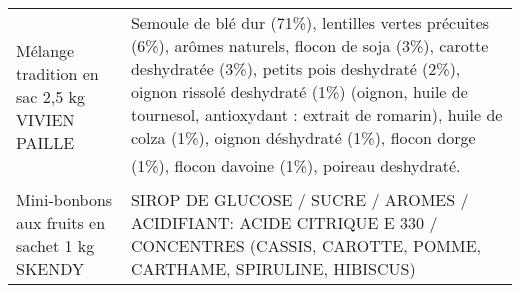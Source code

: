 \begin{longtable}{p{5cm}p{10cm}}
                                                            Mélange tradition en sac 2,5 kg VIVIEN PAILLE &                                                                                                                                                                                                                                                                                                                                                                                                                                                                                                                                                                                                                                                                        Semoule de blé dur (71\%), lentilles vertes précuites (6\%), arômes naturels, flocon de soja (3\%), carotte deshydratée (3\%), petits pois deshydraté (2\%), oignon rissolé deshydraté (1\%) (oignon, huile de tournesol, antioxydant : extrait de romarin), huile de colza (1\%), oignon déshydraté (1\%), flocon dorge (1\%), flocon davoine (1\%), poireau deshydraté. \\
                                                            Mini-bonbons aux fruits en sachet 1 kg SKENDY &                                                                                                                                                                                                                                                                                                                                                                                                                                                                                                                                                                                                                                                                                                                                                                                                                                                                                                SIROP DE GLUCOSE / SUCRE / AROMES / ACIDIFIANT: ACIDE CITRIQUE E 330 / CONCENTRES (CASSIS, CAROTTE, POMME, CARTHAME, SPIRULINE, HIBISCUS) \\

\end{longtable}
